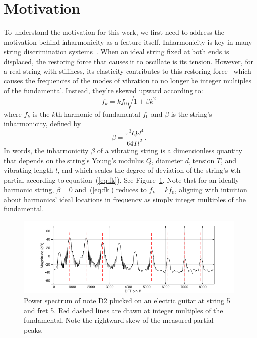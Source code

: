 \documentclass[12pt]{cmuthesis}
\begin{document}
\section{Motivation}
To understand the motivation for this work, we first need to address the motivation behind inharmonicity as a feature itself. Inharmonicity is key in many string discrimination systems~\cite{barbanchoi2012,abesser2012,dittmar2013,kehling2014}. When an ideal string fixed at both ends is displaced, the restoring force that causes it to oscillate is its tension. However, for a real string with stiffness, its elasticity contributes to this restoring force~\cite{fletcher1962} which causes the frequencies of the modes of vibration to no longer be integer multiples of the fundamental. Instead, they're skewed upward according to: 
\begin{equation}
f_k = kf_{0}\sqrt{1+\beta k^2} \label{eq:fk}
\end{equation}
where $f_k$ is the $k$th harmonic of fundamental $f_0$ and $\beta$ is the string's inharmonicity, defined by
\begin{equation}
\beta = \frac{\pi^3 Q d^4}{64 T l^2}. \label{eq:beta}
\end{equation}
In words, the inharmonicity $\beta$ of a vibrating string is a dimensionless quantity that depends on the string's Young's modulus $Q$, diameter $d$, tension $T$, and vibrating length $l$, and which scales the degree of deviation of the string's $k$th partial according to equation~(\ref{eq:fk}). See Figure~\ref{fig:skew}. Note that for an ideally harmonic string, $\beta = 0$ and~(\ref{eq:fk}) reduces to $f_k = kf_0$, aligning with intuition about harmonics' ideal locations in frequency as simply integer multiples of the fundamental.

\begin{figure}[!htbp]
\label{fig:skew}
\centering
\includegraphics[scale=0.65]{skew}
\caption{Power spectrum of note D2 plucked on an electric guitar at string 5 and fret 5. Red dashed lines are drawn at integer multiples of the fundamental. Note the rightward skew of the measured partial peaks.}
\end{figure}
\end{document}
